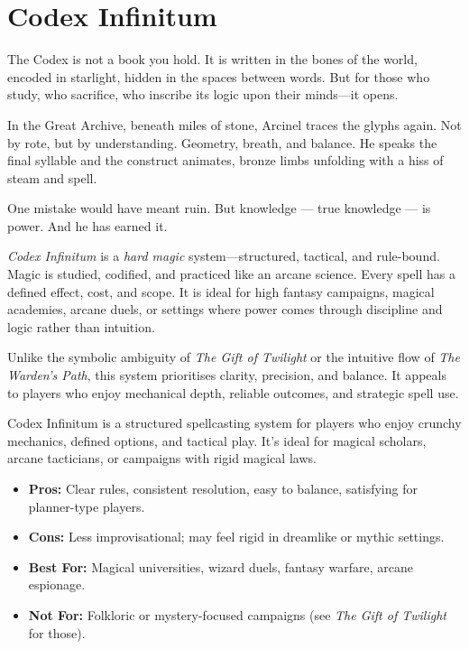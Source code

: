 \section{Codex Infinitum}

\begin{Example}{}
    The Codex is not a book you hold. It is written in the bones of the world, encoded in starlight, hidden in the spaces between words. But for those who study, who sacrifice, who inscribe its logic upon their minds—it opens.

    In the Great Archive, beneath miles of stone, Arcinel traces the glyphs again. Not by rote, but by understanding. Geometry, breath, and balance. He speaks the final syllable and the construct animates, bronze limbs unfolding with a hiss of steam and spell.

    One mistake would have meant ruin. But knowledge — true knowledge — is power. And he has earned it.
\end{Example}

\textit{Codex Infinitum} is a \emph{hard magic} system—structured, tactical, and rule-bound. Magic is studied, codified, and practiced like an arcane science. Every spell has a defined effect, cost, and scope. It is ideal for high fantasy campaigns, magical academies, arcane duels, or settings where power comes through discipline and logic rather than intuition.

Unlike the symbolic ambiguity of \textit{The Gift of Twilight} or the intuitive flow of \textit{The Warden’s Path}, this system prioritises clarity, precision, and balance. It appeals to players who enjoy mechanical depth, reliable outcomes, and strategic spell use.

\begin{GmTips}
    Codex Infinitum is a structured spellcasting system for players who enjoy crunchy mechanics, defined options, and tactical play. It’s ideal for magical scholars, arcane tacticians, or campaigns with rigid magical laws.
    \begin{itemize}
        \item \textbf{Pros:} Clear rules, consistent resolution, easy to balance, satisfying for planner-type players.
        \item \textbf{Cons:} Less improvisational; may feel rigid in dreamlike or mythic settings.
        \item \textbf{Best For:} Magical universities, wizard duels, fantasy warfare, arcane espionage.
        \item \textbf{Not For:} Folkloric or mystery-focused campaigns (see \textit{The Gift of Twilight} for those).
    \end{itemize}
\end{GmTips}

